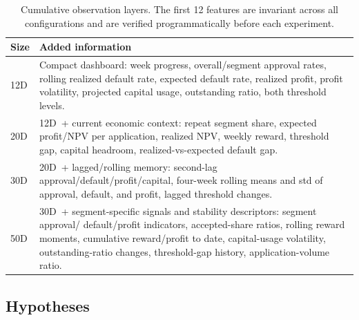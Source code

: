 \documentclass[preprint,review,authoryear,12pt]{elsarticle}
\begin{document}
\begin{table}[t]
    \centering
    \small
    \caption{Cumulative observation layers. The first 12 features are invariant across all
        configurations and are verified programmatically before each experiment.}
    \label{tab:state-layers}
    \begin{tabularx}{0.96\linewidth}{>{\centering\arraybackslash}p{}
            >{\raggedright\arraybackslash}X}
        \toprule
        Size & Added information                                                             \\
        \midrule
        12D  & Compact dashboard: week progress, overall/segment approval rates,
        rolling realized default rate, expected default rate, realized profit, profit
        volatility, projected capital usage, outstanding ratio, both threshold levels.       \\
        20D  & 12D~+ current economic context: repeat segment share, expected profit/NPV per
        application, realized NPV, weekly reward, threshold gap, capital headroom,
        realized-vs-expected default gap.                                                    \\
        30D  & 20D~+ lagged/rolling memory: second-lag approval/default/profit/capital,
        four-week rolling means and std of approval, default, and profit, lagged
        threshold changes.                                                                   \\
        50D  & 30D~+ segment-specific signals and stability descriptors: segment approval/
        default/profit indicators, accepted-share ratios, rolling reward moments,
        cumulative reward/profit to date, capital-usage volatility, outstanding-ratio
        changes, threshold-gap history, application-volume ratio.                            \\
        \bottomrule
    \end{tabularx}
\end{table}

\subsection{Hypotheses}
\label{sec:hypotheses}
\end{document}
